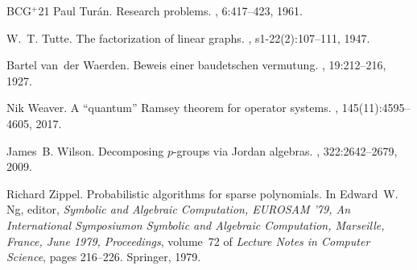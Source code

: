 \documentclass[10pt]{article}
\newcommand{\etalchar}[1]{$^{#1}$}
\begin{document}
\begin{thebibliography}{BCG{\etalchar{+}}21}
Paul Tur{\'a}n.
\newblock Research problems.
, 6:417--423, 1961.

W.~T. Tutte.
\newblock The factorization of linear graphs.
, s1-22(2):107--111,
  1947.

Bartel van~der Waerden.
\newblock Beweis einer baudetschen vermutung.
, 19:212--216, 1927.

Nik Weaver.
\newblock A ``quantum'' {Ramsey} theorem for operator systems.
,
  145(11):4595--4605, 2017.

James~B. Wilson.
\newblock Decomposing {$p$}-groups via {J}ordan algebras.
, 322:2642--2679, 2009.

Richard Zippel.
\newblock Probabilistic algorithms for sparse polynomials.
\newblock In Edward~W. Ng, editor, {\em Symbolic and Algebraic Computation,
  {EUROSAM} '79, An International Symposiumon Symbolic and Algebraic
  Computation, Marseille, France, June 1979, Proceedings}, volume~72 of {\em
  Lecture Notes in Computer Science}, pages 216--226. Springer, 1979.

\end{thebibliography}
\end{document}
